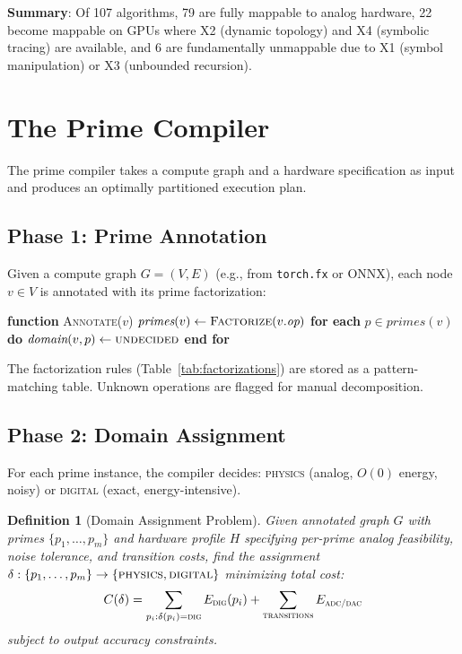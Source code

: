 \documentclass[11pt]{article}
\newtheorem{definition}{Definition}
\begin{document}
\textbf{Summary}: Of 107 algorithms, 79 are fully mappable to analog hardware, 22 become mappable on GPUs where X2 (dynamic topology) and X4 (symbolic tracing) are available, and 6 are fundamentally unmappable due to X1 (symbol manipulation) or X3 (unbounded recursion).

\section{The Prime Compiler}
\label{sec:compiler}

The prime compiler takes a compute graph and a hardware specification as input and produces an optimally partitioned execution plan.

\subsection{Phase 1: Prime Annotation}

Given a compute graph $G = (V, E)$ (e.g., from \texttt{torch.fx} or ONNX), each node $v \in V$ is annotated with its prime factorization:

\begin{algorithmic}
\STATE \textbf{function} \textsc{Annotate}($v$)
\STATE \quad $\textit{primes}(v) \gets \textsc{Factorize}(v.\textit{op})$
\STATE \quad \textbf{for each} $p \in \textit{primes}(v)$ \textbf{do}
\STATE \quad \quad $\textit{domain}(v, p) \gets \textsc{undecided}$
\STATE \quad \textbf{end for}
\end{algorithmic}

The factorization rules (Table~\ref{tab:factorizations}) are stored as a pattern-matching table. Unknown operations are flagged for manual decomposition.

\subsection{Phase 2: Domain Assignment}

For each prime instance, the compiler decides: \textsc{physics} (analog, $O(0)$ energy, noisy) or \textsc{digital} (exact, energy-intensive).

\begin{definition}[Domain Assignment Problem]
Given annotated graph $G$ with primes $\{p_1, \ldots, p_m\}$ and hardware profile $H$ specifying per-prime analog feasibility, noise tolerance, and transition costs, find the assignment $\delta: \{p_1, \ldots, p_m\} \to \{\textsc{physics}, \textsc{digital}\}$ minimizing total cost:
\begin{equation}
C(\delta) = \sum_{p_i: \delta(p_i)=\textsc{dig}} E_{\textsc{dig}}(p_i) + \sum_{\textsc{transitions}} E_{\textsc{adc/dac}}
\end{equation}
subject to output accuracy constraints.
\end{definition}
\end{document}
